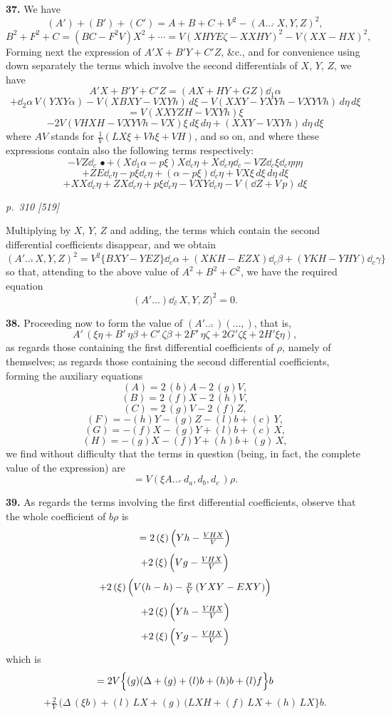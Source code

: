 \documentclass[11pt,a4paper]{book}
\begin{document}
\textbf{37.} We have
\[
(A') + (B') + (C') = A + B + C + V^2 - (A\ldots\,\check{}\,X, Y, Z)^2,
\]
\[
B^2 + F^2 + C = (BC - F^2 V) X^2 + \cdots = V(X H Y E\zeta - XX H Y)^2 - V(X X - HX)^2,
\]
Forming next the expression of $A'X + B'Y + C'Z$, \&c., and for convenience using down separately the terms which involve the second differentials of $X$, $Y$, $Z$, we have
\[
A'X + B'Y + C'Z = (AX + HY + GZ)\dd_{1} \alpha
\]
\[
+ \dd_{2} \alpha\,V(YXY\alpha) - V(XBXY - V XY h)\,d\xi - V(XXY - YXY h - V XY V h)\,d\eta\,d\xi
\]
\[
= V(X X Y Z H - V XY h)\xi
\]
\[
- 2 V(VHX H - V XY V h - V X)\xi\,d\xi\,d\eta + (XXY - V XY h)\,d\eta\,d\xi
\]
where $A V$ stands for $\tfrac{1}{V}(LX\xi + V h\xi + V H)$, and so on, and where these expressions contain also the following terms respectively:
\[
- V Z\dd_{c}\,\bullet + (X\dd_{1} \alpha - p\xi)X\dd_{c}\eta + X\dd_{c}\eta\dd_{c} - V Z\dd_{c}\xi\dd_{c}\eta\eta\eta
\]
\[
+ ZE\dd_{c}\eta - p\xi\dd_{c}\eta + (\alpha - p\xi)\dd_{c}\eta + V X\xi\,d\xi\,d\eta\,d\xi
\]
\[
+ X X\dd_{c}\eta + ZX\dd_{c}\eta + p\xi\dd_{c}\eta - V XY\dd_{c}\eta - V\,(\dd Z + V\,p)\,d\xi
\]

\clearpage

\bigskip
\textit{p.~310 [519]}
\smallskip

\noindent
Multiplying by $X$, $Y$, $Z$ and adding, the terms which contain the second differential coefficients disappear, and we obtain
\[
(A'\ldots\check{}\,X, Y, Z)^2 = V^2\{BXY - YEZ\}\dd_{c} \alpha + (XKH - EZX)\dd_{c} \beta + (YKH - YHY)\dd_{c} \gamma\}
\]
so that, attending to the above value of $A^2 + B^2 + C^2$, we have the required equation
\[
(A'\ldots)\dd_{c}\check{}\,X, Y, Z)^2 = 0.
\]

\textbf{38.} Proceeding now to form the value of $(A'\ldots\check{}\,)(\ldots,)$, that is,
\[
A'\,(\xi\eta + B'\,\eta\beta + C'\,\zeta\beta + 2F'\,\eta\zeta + 2G'\zeta\xi + 2H'\xi\eta),
\]
as regards those containing the first differential coefficients of $\rho$, namely of themselves; as regards those containing the second differential coefficients, forming the auxiliary equations
\[
(A) = 2\,(b)A - 2\,(g)V,
\]
\[
(B) = 2\,(f)X - 2\,(h)V,
\]
\[
(C) = 2\,(g)V - 2\,(f)Z,
\]
\[
(F) = -(h)Y - (g)Z - (l)b + (c)\,Y,
\]
\[
(G) = -(f)X - (g)Y + (l)b + (c)\,X,
\]
\[
(H) = -(g)X - (f)Y + (h)b + (g)\,X,
\]
we find without difficulty that the terms in question (being, in fact, the complete value of the expression) are
\[
= V(\xi A\ldots\,\check{}\,d_{a}, d_{b}, d_{c}\,)\rho.
\]

\textbf{39.} As regards the terms involving the first differential coefficients, observe that the whole coefficient of $b\rho$ is
\[
= 2\,(\xi)\,\Bigl(Y h - \tfrac{V H X}{V}\Bigr)
\]
\[
+ 2\,(\xi)\,\Bigl(V g - \tfrac{V H X}{V}\Bigr)
\]
\[
+ 2\,(\xi)\,\Bigl(V (h - h) - \tfrac{p}{V}\,(YXY - EXY)\Bigr)
\]
\[
+ 2\,(\xi)\,\Bigl(Y h - \tfrac{V H X}{V}\Bigr)
\]
\[
+ 2\,(\xi)\,\Bigl(Y g - \tfrac{V H X}{V}\Bigr)
\]
which is
\[
= 2V\Bigl\{(g)(\Delta + (g) + (l)b + (h)b + (l)f\Bigr\}b
\]
\[
+ \tfrac{2}{V}\,(\Delta\,(\xi b) + (l)\,LX + (g)\,(LX H + (f)\,LX + (h)\,LX\}b.
\]
\end{document}
